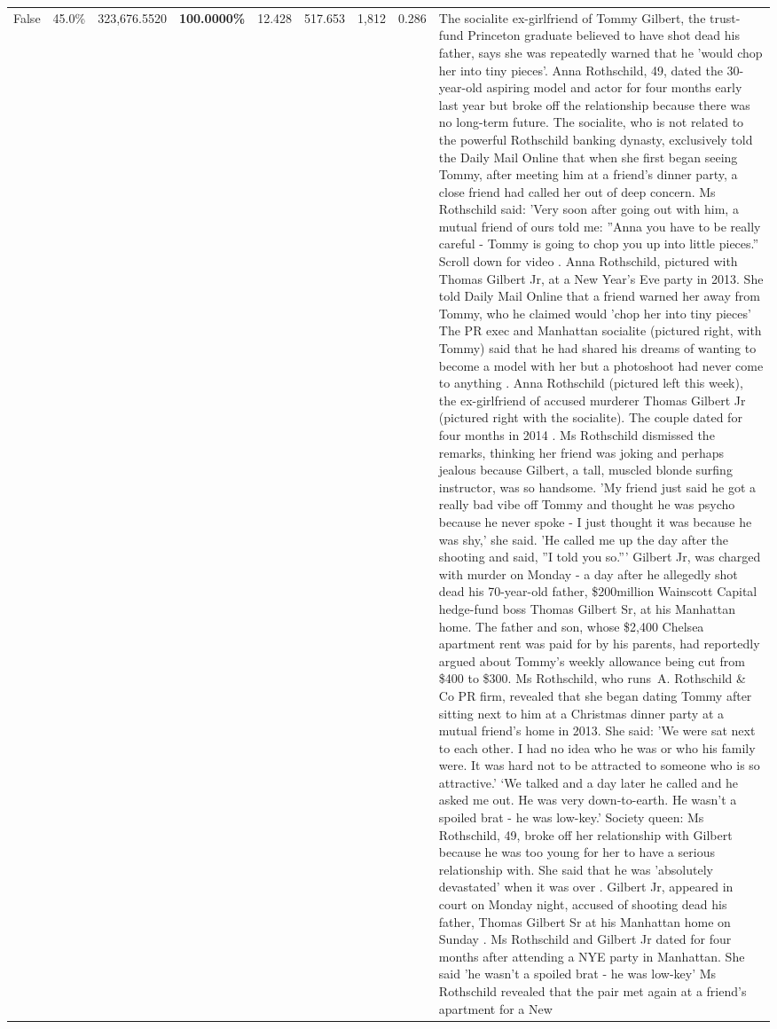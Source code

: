 \begin{table}[H]
\begin{tabular}{lllrlllll}
False & 45.0\% & 323,676.5520 & \bfseries \color{red} 100.0000\% & 12.428 & 517.653 & 1,812 & 0.286 & The socialite ex-girlfriend of Tommy Gilbert, the trust-fund Princeton graduate believed to have shot dead his father, says she was repeatedly warned that he 'would chop her into tiny pieces'. Anna Rothschild, 49, dated the 30-year-old aspiring model and actor for four months early last year but broke off the relationship because there was no long-term future. The socialite, who is not related to the powerful Rothschild banking dynasty, exclusively told the Daily Mail Online that when she first began seeing Tommy, after meeting him at a friend's dinner party, a close friend had called her out of deep concern. Ms Rothschild said: 'Very soon after going out with him, a mutual friend of ours told me: ''Anna you have to be really careful - Tommy is going to chop you up into little pieces.'' Scroll down for video . Anna Rothschild, pictured with Thomas Gilbert Jr, at a New Year's Eve party in 2013. She told Daily Mail Online that a friend warned her away from Tommy, who he claimed would 'chop her into tiny pieces' The PR exec and Manhattan socialite (pictured right, with Tommy) said that he had shared his dreams of wanting to become a model with her but a photoshoot had never come to anything . Anna Rothschild (pictured left this week), the ex-girlfriend of accused murderer Thomas Gilbert Jr (pictured right with the socialite). The couple dated for four months in 2014 . Ms Rothschild dismissed the remarks, thinking her friend was joking and perhaps jealous because Gilbert, a tall, muscled blonde surfing instructor, was so handsome. 'My friend just said he got a really bad vibe off Tommy and thought he was psycho because he never spoke - I just thought it was because he was shy,' she said. 'He called me up the day after the shooting and said, ''I told you so.''' Gilbert Jr, was charged with murder on Monday - a day after he allegedly shot dead his 70-year-old father, \$200million Wainscott Capital hedge-fund boss Thomas Gilbert Sr, at his Manhattan home. The father and son, whose \$2,400 Chelsea apartment rent was paid for by his parents, had reportedly argued about Tommy's weekly allowance being cut from \$400 to \$300. Ms Rothschild, who runs A. Rothschild \& Co PR firm, revealed that she began dating Tommy after sitting next to him at a Christmas dinner party at a mutual friend's home in 2013. She said: 'We were sat next to each other. I had no idea who he was or who his family were. It was hard not to be attracted to someone who is so attractive.' ‘We talked and a day later he called and he asked me out. He was very down-to-earth. He wasn’t a spoiled brat - he was low-key.’ Society queen: Ms Rothschild, 49, broke off her relationship with Gilbert because he was too young for her to have a serious relationship with. She said that he was 'absolutely devastated' when it was over . Gilbert Jr, appeared in court on Monday night, accused of shooting dead his father, Thomas Gilbert Sr at his Manhattan home on Sunday . Ms Rothschild and Gilbert Jr dated for four months after attending a NYE party in Manhattan. She said 'he wasn't a spoiled brat - he was low-key' Ms Rothschild revealed that the pair met again at a friend’s apartment for a New 
\end{tabular}
\end{table}
